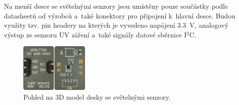 Na menší desce se světelnými senzory jsou umístěny pouze součástky podle datasheetů od výrobců a~také konektory pro připojení k~hlavní desce. Budou využity tzv. pin headery na kterých je vyvedeno napájení \SI{3.3}{\volt}, analogový výstup ze senzoru UV záření a~také signály datové sběrnice I$^2$C.

\begin{figure}
    \centering
    \includegraphics[width=0.3\textwidth]{obrazky/sensorBoard-kicad.png}
    \caption{Pohled na 3D model desky se světelnými senzory.}
    \label{fig_sensorBoardKicadRender}
\end{figure}





